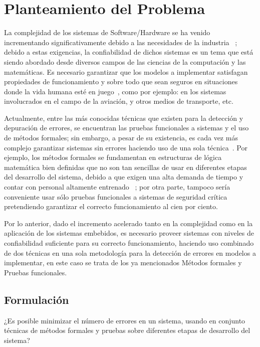 

\section{Planteamiento del Problema}

La complejidad de los sistemas de Software/Hardware se ha venido incrementando 
significativamente debido a las necesidades de la industria 
~\cite{Clarke1996,Schneider2004,AlexeiSernaA}; debido a estas exigencias, la 
confiabilidad de dichos sistemas es un tema que est\'a siendo abordado desde 
diversos campos de las ciencias de la computaci\'on y las matem\'aticas. Es 
necesario garantizar que los modelos a implementar satisfagan propiedades de 
funcionamiento y sobre todo que sean seguros en situaciones donde la vida humana 
est\'e en juego~\cite{Gaudel1996,Bowen2000}, como por ejemplo: en los sistemas 
involucrados en el campo de la aviaci\'on, y otros medios de transporte, etc.

Actualmente, entre las m\'as conocidas t\'ecnicas que existen para la 
detecci\'on y depuraci\'on de errores, se encuentran las pruebas funcionales a 
sistemas y el uso de m\'etodos formales; sin embargo, a pesar de su existencia, 
es cada vez m\'as complejo garantizar sistemas sin errores haciendo uso de una 
sola t\'ecnica~\cite{Gaudel1996}. Por ejemplo, los m\'etodos formales se 
fundamentan en estructuras de l\'ogica matem\'atica bien definidas que no son 
tan sencillas de usar en diferentes etapas del desarrollo del sistema, debido a 
que exigen una alta demanda de tiempo y contar con personal altamente entrenado 
~\cite{AlexeiSernaA}; por otra parte, tampoco ser\'ia conveniente usar s\'olo 
pruebas funcionales a sistemas de seguridad cr\'itica pretendiendo garantizar 
el correcto funcionamiento al cien por ciento.

Por lo anterior, dado el incremento acelerado tanto en la complejidad como en la 
aplicaci\'on de los sistemas embebidos, es necesario proveer sistemas con niveles de 
confiabilidad suficiente para su correcto funcionamiento, haciendo uso combinado de dos t\'ecnicas en una sola metodolog\'ia
para la detecci\'on de errores en modelos a implementar, en este caso se trata 
de los ya mencionados M\'etodos formales y Pruebas funcionales.

\subsection{Formulaci\'on}

¿Es posible minimizar el n\'umero de errores en un sistema, usando en conjunto 
t\'ecnicas de m\'etodos formales y pruebas sobre diferentes etapas de desarrollo 
del sistema?

